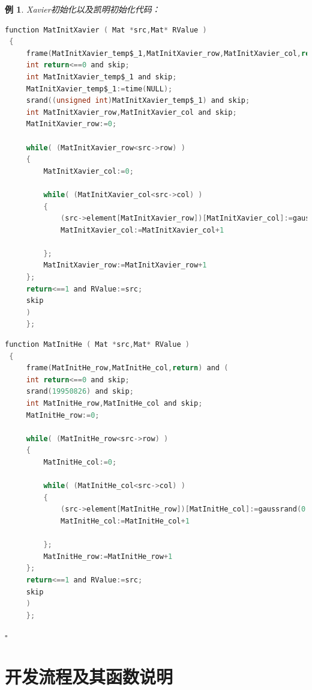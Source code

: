 \documentclass[UTF-8]{progbookcn}
\newtheorem{example}{例}[chapter]         %
\begin{document}
\begin{example}
{\setsansfont{Myriad Pro}Xavier}初始化以及凯明初始化代码：
\begin{lstlisting}[language=C,caption={函数 5 MatInitXavier}]
function MatInitXavier ( Mat *src,Mat* RValue )
 {
     frame(MatInitXavier_temp$_1,MatInitXavier_row,MatInitXavier_col,return) and (
     int return<==0 and skip;
     int MatInitXavier_temp$_1 and skip;
     MatInitXavier_temp$_1:=time(NULL);
     srand((unsigned int)MatInitXavier_temp$_1) and skip;
     int MatInitXavier_row,MatInitXavier_col and skip;
     MatInitXavier_row:=0;

     while( (MatInitXavier_row<src->row) )
     {
         MatInitXavier_col:=0;

         while( (MatInitXavier_col<src->col) )
         {
             (src->element[MatInitXavier_row])[MatInitXavier_col]:=gaussrand(0.0,0.1,RValue)*(float)sqrt(1.0/ src->row);        // 依照公式  每项生成
             MatInitXavier_col:=MatInitXavier_col+1

         };
         MatInitXavier_row:=MatInitXavier_row+1
     };
     return<==1 and RValue:=src;
     skip
     )
     };
\end{lstlisting}

\begin{lstlisting}[language=C,caption={函数 6 MatInitHe}]
 function MatInitHe ( Mat *src,Mat* RValue )
 {
     frame(MatInitHe_row,MatInitHe_col,return) and (
     int return<==0 and skip;
     srand(19950826) and skip;
     int MatInitHe_row,MatInitHe_col and skip;
     MatInitHe_row:=0;

     while( (MatInitHe_row<src->row) )
     {
         MatInitHe_col:=0;

         while( (MatInitHe_col<src->col) )
         {
             (src->element[MatInitHe_row])[MatInitHe_col]:=gaussrand(0.0,0.9,RValue)*(float)sqrt(2.0/ src->row);        // 依照公式  每项生成
             MatInitHe_col:=MatInitHe_col+1

         };
         MatInitHe_row:=MatInitHe_row+1
     };
     return<==1 and RValue:=src;
     skip
     )
     };
\end{lstlisting} \hfill$\square$
\end{example}




\section{开发流程及其函数说明}
\end{document}
